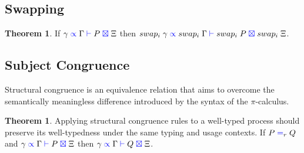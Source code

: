 \documentclass[a4paper,UKenglish,cleveref, autoref, thm-restate,authorcolumns]{lipics-v2019}
\theoremstyle{definition}
\newtheorem{nitheorem}[theorem]{Theorem}
\newcommand{\picalc}{$\pi$-calculus}
\newcommand{\type}[1]{\textcolor{blue}{\operatorname{#1}}}
\newcommand{\types}[4]{#1 \; \type{\propto} \; #2 \; \type{\vdash} \; #3 \; \type{\boxtimes} \; #4}
\newcommand{\eq}[1]{\; \type{=}_{#1} \;}
\begin{document}
\subsection{Swapping}

\begin{nitheorem}
  If $\types{\gamma}{\Gamma}{P}{\Xi}$ then $\types{swap_i \; \gamma}{swap_i \; \Gamma}{swap_i \; P}{swap_i \; \Xi}$.
\end{nitheorem}

\subsection{Subject Congruence}
\label{subject-congruence}

Structural congruence is an equivalence relation that aims to overcome the semantically meaningless difference introduced by the syntax of the \picalc{}.

\begin{nitheorem}
  \label{thm:subject-congruence}
  Applying structural congruence rules to a well-typed process should preserve its well-typedness under the same typing and usage contexts.
  If $P \eq{r} Q$ and $\types{\gamma}{\Gamma}{P}{\Xi}$ then $\types{\gamma}{\Gamma}{Q}{\Xi}$.
\end{nitheorem}
\end{document}
